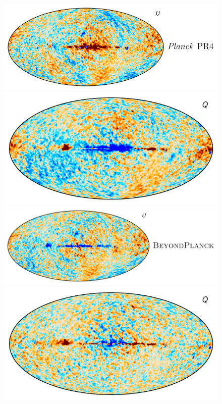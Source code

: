 \documentclass[twocolumn]{../../common/aa}
\begin{document}
\begin{figure}
	\includegraphics[height=0.15\textheight]{figures/diff_NPIPE_DR5_U.pdf}
	\newline
	\includegraphics[height=0.15\textheight]{figures/diff_BP_DR5_Q.pdf}
	\includegraphics[height=0.15\textheight]{figures/diff_BP_DR5_U.pdf}
	\newline
	\includegraphics[height=0.15\textheight]{figures/diff_CG_Q.pdf}

\end{figure}
\end{document}
